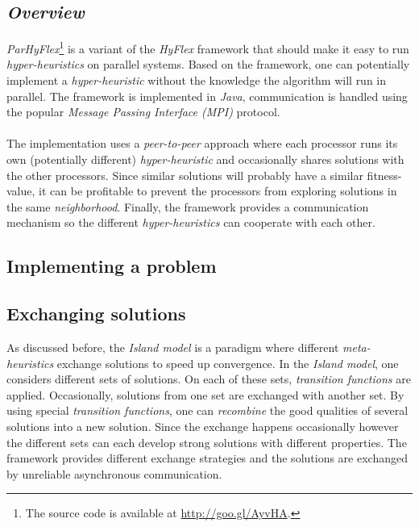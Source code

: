\documentclass[a4paper,10pt]{article}
\newcommand{\seclab}[1]{\label{sec:#1}}
\theoremstyle{definition}
\begin{document}
\subsection{\emph{Overview}}

\emph{ParHyFlex}\footnote{The source code is available at \url{http://goo.gl/AyvHA}.} is a variant of the \emph{HyFlex} framework that should make it easy to run \emph{hyper-heuristics} on parallel systems. Based on the framework, one can potentially implement a \emph{hyper-heuristic} without the knowledge the algorithm will run in parallel. The framework is implemented in \emph{Java}, communication is handled using the popular \emph{Message Passing Interface (MPI)} protocol.

\paragraph{}
The implementation uses a \emph{peer-to-peer} approach where each processor runs its own (potentially different) \emph{hyper-heuristic} and occasionally shares solutions with the other processors. Since similar solutions will probably have a similar fitness-value, it can be profitable to prevent the processors from exploring solutions in the same \emph{neighborhood}. Finally, the framework provides a communication mechanism so the different \emph{hyper-heuristics} can cooperate with each other.

\subsection{Implementing a problem}

\subsection{Exchanging solutions}
\seclab{exchangingsolutions}
As discussed before, the \emph{Island model}\cite{} is a paradigm where different \emph{meta-heuristics} exchange solutions to speed up convergence. %
In the \emph{Island model}, one considers different sets of solutions. On each of these sets, \emph{transition functions} are applied. Occasionally, solutions from one set are exchanged with another set.
By using special \emph{transition functions}, one can \emph{recombine} the good qualities of several solutions into a new solution. Since the exchange happens occasionally however the different sets can each develop strong solutions with different properties. The framework provides different exchange strategies and the solutions are exchanged by unreliable asynchronous communication.%
\end{document}

